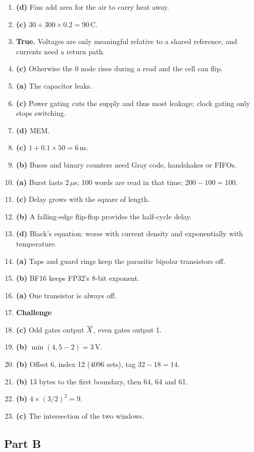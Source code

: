 \begin{enumerate}
  \item \textbf{(d)} Fins add area for the air to carry heat away.
  \item \textbf{(c)} $30 + 300 \times 0.2 = 90$\,\textdegree C.
  \item \textbf{True.} Voltages are only meaningful relative to a shared reference, and currents need a return path.
  \item \textbf{(c)} Otherwise the 0 node rises during a read and the cell can flip.
  \item \textbf{(a)} The capacitor leaks.
  \item \textbf{(c)} Power gating cuts the supply and thus most leakage; clock gating only stops switching.
  \item \textbf{(d)} MEM.
  \item \textbf{(c)} $1 + 0.1 \times 50 = 6$\,ns.
  \item \textbf{(b)} Buses and binary counters need Gray code, handshakes or FIFOs.
  \item \textbf{(a)} Burst lasts 2\,$\mu$s; 100 words are read in that time; $200 - 100 = 100$.
  \item \textbf{(c)} Delay grows with the square of length.
  \item \textbf{(b)} A falling-edge flip-flop provides the half-cycle delay.
  \item \textbf{(d)} Black's equation: worse with current density and exponentially with temperature.
  \item \textbf{(a)} Taps and guard rings keep the parasitic bipolar transistors off.
  \item \textbf{(b)} BF16 keeps FP32's 8-bit exponent.
  \item \textbf{(a)} One transistor is always off.
  \item[] \textbf{Challenge}
  \item \textbf{(c)} Odd gates output $\overline{X}$, even gates output 1.
  \item \textbf{(b)} $\min(4, 5 - 2) = 3$\,V.
  \item \textbf{(b)} Offset 6, index 12 (4096 sets), tag $32 - 18 = 14$.
  \item \textbf{(b)} 13 bytes to the first boundary, then 64, 64 and 61.
  \item \textbf{(b)} $4 \times (3/2)^2 = 9$.
  \item \textbf{(c)} The intersection of the two windows.
\end{enumerate}

\subsection*{Part B}

